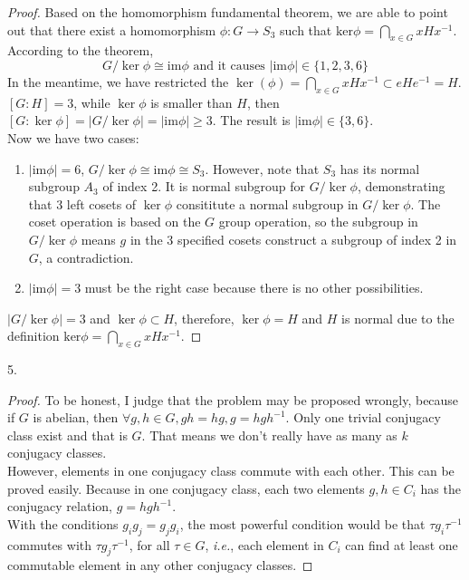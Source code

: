 \begin{proof}
    Based on the homomorphism fundamental theorem, we are able to point out that there exist a homomorphism $\phi: G \rightarrow S_3$ such that $\text{ker} \phi=\bigcap_{x\in G} xHx^{-1}$. According to the theorem, $$G/\ker \phi\cong\text{im} \phi \text{ and it causes } |\text{im} \phi|\in \{1,2,3,6\}$$ 
    In the meantime, we have restricted the $\ker (\phi)=\bigcap_{x\in G} xHx^{-1} \subset eHe^{-1}=H$. $[G: H]=3$, while $\ker \phi$ is smaller than $H$, then $[G:\ker \phi] = |G/ \ker \phi|= |\text{im} \phi| \geq 3$. The result is $|\text{im} \phi|\in \{3,6\}$.\\
    Now we have two cases:
    \begin{enumerate}
        \item $|\text{im} \phi|=6$, $G/ \ker \phi\cong\text{im} \phi\cong S_3$. However, note that $S_3$ has its normal subgroup $A_3$ of index 2. It is normal subgroup for $G/\ker \phi$, demonstrating that 3 left cosets of $\ker \phi$ consititute a normal subgroup in $G/\ker \phi$. The coset operation is based on the $G$ group operation, so the subgroup in $G/\ker \phi$ means $g$ in the 3 specified cosets construct a subgroup of index 2 in $G$, a contradiction.
        \item $|\text{im} \phi|=3$ must be the right case because there is no other possibilities. 
    \end{enumerate}
    $|G/\ker \phi|=3$ and $\ker \phi \subset H$, therefore, $\ker \phi=H$ and $H$ is normal due to the definition $\text{ker} \phi=\bigcap_{x\in G} xHx^{-1}$.

\end{proof}

\begin{exercise}
    5.
\end{exercise}

\begin{proof}
    To be honest, I judge that the problem may be proposed wrongly, because if $G$ is abelian, then $\forall g,h\in G, gh=hg, g=hgh^{-1}$. Only one trivial conjugacy class exist and that is $G$. That means we don't really have as many as $k$ conjugacy classes.\\

      However, elements in one conjugacy class commute with each other. This can be proved easily. Because in one conjugacy class, each two elements $g,h\in C_i$ has the conjugacy relation, $g=hgh^{-1}$.\\ 

      With the conditions $g_ig_j=g_jg_i$, the most powerful condition would be that $\tau g_i\tau^{-1}$ commutes with $\tau g_j\tau^{-1}$, for all $\tau \in G$, \textit{i.e.}, each element in $C_i$ can find at least one commutable element in any other conjugacy classes.
\end{proof}


